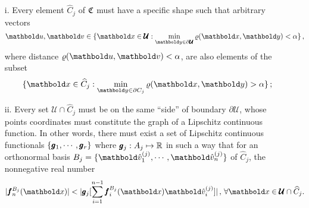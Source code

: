 \begin{itemize}
	\setlength\itemsep{.1em}
	\item[i.] Every element $\widehat{C}_j$ of $\mathfrak{C}$ must have a specific shape such that arbitrary vectors 
\begin{equation*}
\vto{u},\vto{v}\in\{\vto{x}\in\pmb{\mathcal{U}}:\min_{\vto{y}\in \partial\pmb{\mathcal{U}}}\fua{\varrho}{\vto{x},\vto{y}}<\alpha\}\,,
\end{equation*}
where distance $\fua{\varrho}{\vto{u},\vto{v}}<\alpha$, are also elements of the subset	
\begin{equation*}
\{\vto{x}\in\widehat{C}_j:\min_{\vto{y}\in \partial C_j}\fua{\varrho}{\vto{x},\vto{y}}>\alpha\}\,;
\end{equation*}

\item[ii.] Every set $\pmb{\mathcal{U}}\cap \widehat{C}_j$ must be on the same ``side'' of boundary $\partial\pmb{\mathcal{U}}$, whose points coordinates must constitute the graph of a Lipschitz continuous function. In other words, there must exist a set of Lipschitz continuous functionals $\{\pmb{g}_1,\cdots,\pmb{g}_r\}$ where $\pmb{g}_j : A_j \mapsto \mathbb{R}$ in such a way that for an orthonormal basis $B_j=\{\vun{v}_1^{(j)},\cdots,\vun{v}_n^{(j)}\}$ of $\widehat{C}_j$, the nonnegative real number
\begin{equation*}
|\fua{\vtf{f}_n^{B_j}}{\vto{x}}|<|\vtf{g}_j[\sum_{i=1}^{n-1}\fua{\vtf{f}_i^{B_j}}{\vto{x}}\vun{v}_i^{(j)}]|\,,\,\forall \vto{x}\in \pmb{\mathcal{U}}\cap\widehat{C}_j.
\end{equation*}	
\end{itemize}

